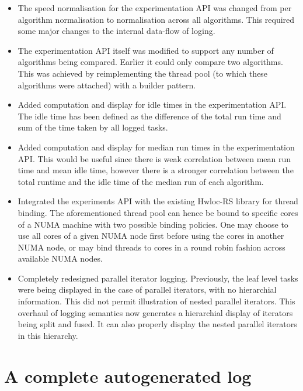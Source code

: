 \begin{itemize}
\item The speed normalisation for the experimentation API was changed from per algorithm normalisation to normalisation across all algorithms. This required some major changes to the internal data-flow of loging.
\item The experimentation API itself was modified to support any number of algorithms being compared. Earlier it could only compare two algorithms. This was achieved by reimplementing the thread pool (to which these algorithms were attached) with a builder pattern.
\item Added computation and display for idle times in the experimentation API. The idle time has been defined as the difference of the total run time and sum of the time taken by all logged tasks.
\item Added computation and display for median run times in the experimentation API. This would be useful since there is weak correlation between mean run time and mean idle time, however there is a stronger correlation between the total runtime and the idle time of the median run of each algorithm.
\item Integrated the experiments API with the existing Hwloc-RS library for thread binding. The aforementioned thread pool can hence be bound to specific cores of a NUMA machine with two possible binding policies. One may choose to use all cores of a given NUMA node first before using the cores in another NUMA node, or may bind threads to cores in a round robin fashion across available NUMA nodes.
\item Completely redesigned parallel iterator logging. Previously, the leaf level tasks were being displayed in the case of parallel iterators, with no hierarchial information. This did not permit illustration of nested parallel iterators. This overhaul of logging semantics now generates a hierarchial display of iterators being split and fused. It can also properly display the nested parallel iterators in this hierarchy.
\end{itemize}

\section{A complete autogenerated log}

    
